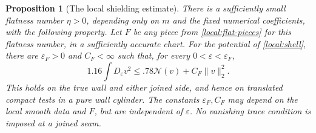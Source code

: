 \documentclass[11pt]{article}
\numberwithin{equation}{section}
\newtheorem{proposition}[theorem]{Proposition}
\theoremstyle{definition}
\theoremstyle{remark}
\begin{document}
\begin{proposition}[The local shielding estimate]\label{local:sharp}
There is a sufficiently small flatness number $\eta>0$, depending
only on $m$ and the fixed numerical coefficients, with the following
property.  Let $F$ be any piece from \cref{local:flat-pieces} for this
flatness number, in a sufficiently accurate chart.  For the potential
of \cref{local:shell}, there are $\varepsilon_F>0$ and $C_F<\infty$
such that, for every $0<\varepsilon<\varepsilon_F$,
\begin{equation}\label{local:sharp-estimate}
 1.16\int D_\varepsilon v^2
           \le .78\mathcal N(v)+C_F\|v\|_2^2.
\end{equation}
This holds on the true wall and either joined side, and hence on
translated compact tests in a pure wall cylinder.  The constants
$\varepsilon_F,C_F$ may depend on the local smooth data and $F$,
but are independent of $\varepsilon$.  No vanishing trace condition
is imposed at a joined seam.
\end{proposition}
\end{document}
